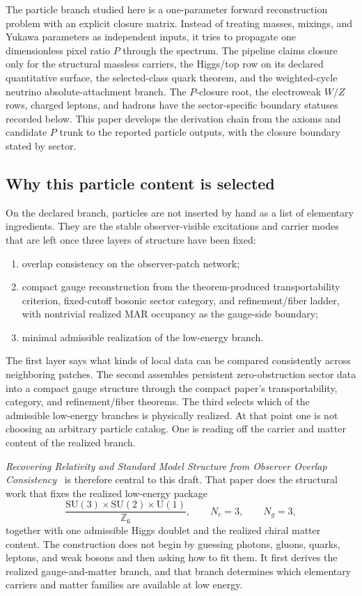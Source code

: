 \documentclass[11pt]{article}
\newcommand{\SU}{\mathrm{SU}}
\newcommand{\U}{\mathrm{U}}
\begin{document}
The particle branch studied here is a one-parameter forward reconstruction problem with an
explicit closure matrix. Instead of treating masses, mixings, and Yukawa parameters as independent
inputs, it tries to propagate one dimensionless pixel ratio \(P\) through the spectrum. The
pipeline claims closure only for the structural massless carriers, the Higgs/top row on its
declared quantitative surface, the selected-class quark theorem, and the weighted-cycle neutrino
absolute-attachment branch. The \(P\)-closure root, the electroweak \(W/Z\) rows, charged leptons,
and hadrons have the sector-specific boundary statuses recorded below. This paper develops the
derivation chain from the axioms and candidate \(P\) trunk to the reported particle outputs, with
the closure boundary stated by sector.

\subsection{Why this particle content is selected}

On the declared branch, particles are not inserted by hand as a list of elementary
ingredients. They are the stable observer-visible excitations and carrier modes that
are left once three layers of structure have been fixed:
\begin{enumerate}[leftmargin=2em]
\item overlap consistency on the observer-patch network;
\item compact gauge reconstruction from the theorem-produced transportability criterion, fixed-cutoff bosonic sector category, and refinement/fiber ladder, with nontrivial realized MAR occupancy as the gauge-side boundary;
\item minimal admissible realization of the low-energy branch.
\end{enumerate}
The first layer says what kinds of local data can be compared consistently across neighboring
patches. The second assembles persistent zero-obstruction sector data into a compact gauge
structure through the compact paper's transportability, category, and refinement/fiber theorems.
The third selects which of the admissible low-energy branches is physically realized.
At that point one is not choosing an arbitrary particle catalog. One is reading off the
carrier and matter content of the realized branch.

\emph{Recovering Relativity and Standard Model Structure from Observer Overlap Consistency}~\cite{ophcompact} is therefore central to this draft. That paper does
the structural work that fixes the realized low-energy package
\[
\frac{\SU(3)\times\SU(2)\times\U(1)}{\mathbb Z_6},
\qquad
N_c=3,
\qquad
N_g=3,
\]
together with one admissible Higgs doublet and the realized chiral matter content. The
construction does not begin by guessing photons, gluons, quarks, leptons, and weak bosons and
then asking how to fit them. It first derives the realized gauge-and-matter branch, and that
branch determines which elementary carriers and matter families are available at low energy.
\end{document}
